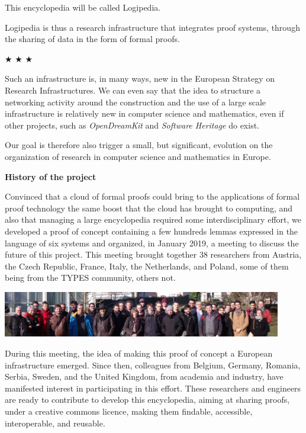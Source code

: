 This encyclopedia will be called Logipedia.

Logipedia is thus a research infrastructure that integrates proof
systems, through the sharing of data in the form of formal proofs.

\begin{center}
  
$\bigstar$ $\bigstar$ $\bigstar$

\end{center}

Such an infrastructure is, in many ways, new in the European Strategy
on Research Infrastructures. We can even say that the idea to
structure a networking activity around the construction and the use of
a large scale infrastructure is relatively new in computer science and
mathematics, even if other projects, such as {\em OpenDreamKit} and
{\em Software Heritage} do exist.

Our goal is therefore also trigger a
small, but significant, evolution on the organization of research in
computer science and mathematics in Europe.

\begin{framed}
  \vspace*{-0.5cm}
  \begin{center}
{\bf \Large History of the project}
\end{center}

Convinced that a cloud of formal proofs could bring to the
applications of formal proof technology the same boost that the cloud
has brought to computing, and also that managing a large encyclopedia
required some interdisciplinary effort,
we developed a proof of concept containing a few hundreds lemmas
expressed in the language of six systems and organized, in January 2019,
a meeting to discuss the future of this project.
This
meeting brought together 38 researchers from Austria, the Czech
Republic, France, Italy, the Netherlands, and Poland, some of them
being from the TYPES community, others not.
\begin{center}
\includegraphics[height=2cm]{photo.png}
\end{center}
During this meeting, the idea of making this proof of concept a
European infrastructure emerged.  Since then, colleagues from Belgium,
Germany, Romania, Serbia, Sweden, and the United Kingdom, from
academia and industry, have manifested interest in participating in
this effort.  These researchers and engineers are ready to contribute
to develop this encyclopedia, aiming at sharing proofs, under a
creative commons licence, making them findable, accessible,
interoperable, and reusable.
\end{framed}


